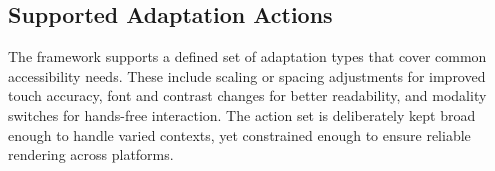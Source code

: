 \documentclass[openany]{book}
\begin{document}
\subsection{Supported Adaptation Actions}
The framework supports a defined set of adaptation types that cover common accessibility needs. These include scaling or spacing adjustments for improved touch accuracy, font and contrast changes for better readability, and modality switches for hands-free interaction. The action set is deliberately kept broad enough to handle varied contexts, yet constrained enough to ensure reliable rendering across platforms.
\end{document}
